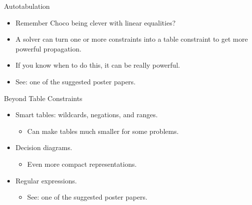 \documentclass[aspectratio=169,compress,10pt]{beamer}
\begin{document}
\begin{frame}{Autotabulation}
    \begin{itemize}
        \item Remember Choco being clever with linear equalities?
        \item A solver can turn one or more constraints into a table constraint
            to get more powerful propagation.
        \item If you know when to do this, it can be really powerful.
        \item See: one of the suggested poster papers.
    \end{itemize}
\end{frame}

\begin{frame}{Beyond Table Constraints}
    \begin{itemize}
        \item Smart tables: wildcards, negations, and ranges.
            \begin{itemize}
                \item Can make tables much smaller for some problems.
            \end{itemize}
        \item Decision diagrams.
            \begin{itemize}
                \item Even more compact representations.
            \end{itemize}
        \item Regular expressions.
            \begin{itemize}
                \item See: one of the suggested poster papers.
            \end{itemize}
    \end{itemize}
\end{frame}
\end{document}
